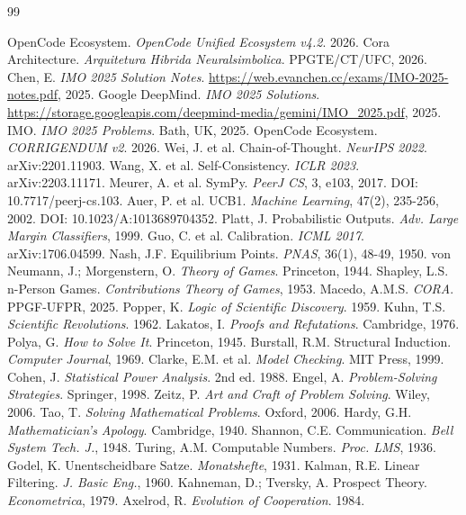 \documentclass[5p]{elsarticle}
\begin{document}
\begin{thebibliography}{99}

 OpenCode Ecosystem. \textit{OpenCode Unified Ecosystem v4.2}. 2026.
 Cora Architecture. \textit{Arquitetura Hibrida Neuralsimbolica}. PPGTE/CT/UFC, 2026.
 Chen, E. \textit{IMO 2025 Solution Notes}. \url{https://web.evanchen.cc/exams/IMO-2025-notes.pdf}, 2025.
 Google DeepMind. \textit{IMO 2025 Solutions}. \url{https://storage.googleapis.com/deepmind-media/gemini/IMO_2025.pdf}, 2025.
 IMO. \textit{IMO 2025 Problems}. Bath, UK, 2025.
 OpenCode Ecosystem. \textit{CORRIGENDUM v2}. 2026.
 Wei, J. et al. Chain-of-Thought. \textit{NeurIPS 2022}. arXiv:2201.11903.
 Wang, X. et al. Self-Consistency. \textit{ICLR 2023}. arXiv:2203.11171.
 Meurer, A. et al. SymPy. \textit{PeerJ CS}, 3, e103, 2017. DOI: 10.7717/peerj-cs.103.
 Auer, P. et al. UCB1. \textit{Machine Learning}, 47(2), 235-256, 2002. DOI: 10.1023/A:1013689704352.
 Platt, J. Probabilistic Outputs. \textit{Adv. Large Margin Classifiers}, 1999.
 Guo, C. et al. Calibration. \textit{ICML 2017}. arXiv:1706.04599.
 Nash, J.F. Equilibrium Points. \textit{PNAS}, 36(1), 48-49, 1950.
 von Neumann, J.; Morgenstern, O. \textit{Theory of Games}. Princeton, 1944.
 Shapley, L.S. n-Person Games. \textit{Contributions Theory of Games}, 1953.
 Macedo, A.M.S. \textit{CORA}. PPGF-UFPR, 2025.
 Popper, K. \textit{Logic of Scientific Discovery}. 1959.
 Kuhn, T.S. \textit{Scientific Revolutions}. 1962.
 Lakatos, I. \textit{Proofs and Refutations}. Cambridge, 1976.
 Polya, G. \textit{How to Solve It}. Princeton, 1945.
 Burstall, R.M. Structural Induction. \textit{Computer Journal}, 1969.
 Clarke, E.M. et al. \textit{Model Checking}. MIT Press, 1999.
 Cohen, J. \textit{Statistical Power Analysis}. 2nd ed. 1988.
 Engel, A. \textit{Problem-Solving Strategies}. Springer, 1998.
 Zeitz, P. \textit{Art and Craft of Problem Solving}. Wiley, 2006.
 Tao, T. \textit{Solving Mathematical Problems}. Oxford, 2006.
 Hardy, G.H. \textit{Mathematician's Apology}. Cambridge, 1940.
 Shannon, C.E. Communication. \textit{Bell System Tech. J.}, 1948.
 Turing, A.M. Computable Numbers. \textit{Proc. LMS}, 1936.
 Godel, K. Unentscheidbare Satze. \textit{Monatshefte}, 1931.
 Kalman, R.E. Linear Filtering. \textit{J. Basic Eng.}, 1960.
 Kahneman, D.; Tversky, A. Prospect Theory. \textit{Econometrica}, 1979.
 Axelrod, R. \textit{Evolution of Cooperation}. 1984.

\end{thebibliography}
\end{document}
